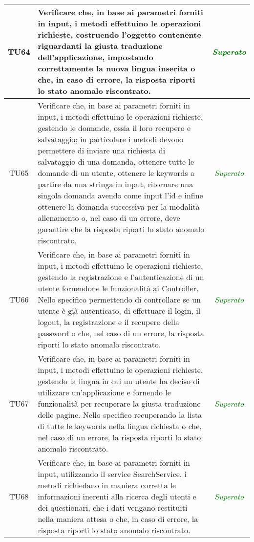 \begin{longtable}{|c|>{}m{10cm}|c|}
\hypertarget{TU64}{TU64} & Verificare che, in base ai parametri forniti in input,
i metodi effettuino le operazioni richieste, costruendo l’oggetto contenente riguardanti la giusta traduzione dell’applicazione, impostando correttamente la nuova lingua inserita o che, in caso di errore, la risposta riporti lo stato anomalo riscontrato. & \textcolor{Green}{\textit{Superato}}\\ \hline
\hypertarget{TU65}{TU65} & Verificare che, in base ai parametri forniti in input, i metodi effettuino le operazioni richieste, gestendo le domande, ossia il loro recupero e salvataggio; in particolare i metodi devono permettere di inviare una richiesta di salvataggio di una domanda, ottenere tutte le domande di un utente, ottenere le keywords a partire da una stringa in input, ritornare una singola domanda avendo come input l'id e infine ottenere la domanda successiva per la modalità allenamento o, nel caso di un errore, deve garantire che la risposta riporti lo stato anomalo riscontrato. & \textcolor{Green}{\textit{Superato}}\\ \hline
\hypertarget{TU66}{TU66} & Verificare che, in base ai parametri forniti in input, i metodi effettuino le operazioni richieste, gestendo la registrazione e l'autenticazione di un utente fornendone le funzionalità ai Controller. Nello specifico permettendo di controllare se un utente è già autenticato, di effettuare il login, il logout, la registrazione e il recupero della password o che, nel caso di un errore, la risposta riporti lo stato anomalo riscontrato. & \textcolor{Green}{\textit{Superato}}\\ \hline
\hypertarget{TU67}{TU67} & Verificare che, in base ai parametri forniti in input, i metodi effettuino le operazioni richieste, gestendo la lingua in cui un utente ha deciso di utilizzare un'applicazione e fornendo le funzionalità per recuperare la giusta traduzione delle pagine. Nello specifico recuperando la lista di tutte le keywords nella lingua richiesta o che, nel caso di un errore, la risposta riporti lo stato anomalo riscontrato. & \textcolor{Green}{\textit{Superato}}\\ \hline
\hypertarget{TU68}{TU68} & Verificare che, in base ai parametri forniti in input, utilizzando il service SearchService, i metodi richiedano in maniera corretta le informazioni inerenti alla ricerca degli utenti e dei questionari, che i dati vengano restituiti nella maniera attesa o che, in caso di errore, la risposta riporti lo stato anomalo riscontrato. & \textcolor{Green}{\textit{Superato}}\\ \hline

\end{longtable}
